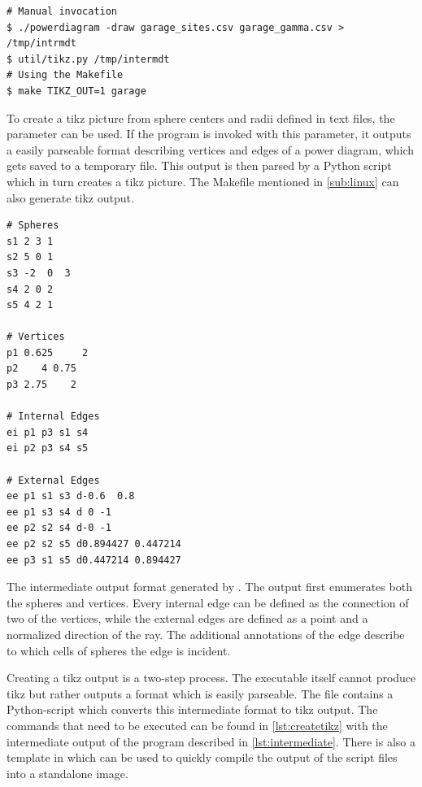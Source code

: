 \begin{listing}[tb]
    \begin{verbatim}
# Manual invocation
$ ./powerdiagram -draw garage_sites.csv garage_gamma.csv > /tmp/intrmdt
$ util/tikz.py /tmp/intermdt
# Using the Makefile
$ make TIKZ_OUT=1 garage
    \end{verbatim}
    \caption{To create a tikz picture from sphere centers and radii defined in text files, the  parameter can be used.
        If the program is invoked with this parameter, it outputs a easily parseable format describing vertices and edges of a power diagram, which gets saved to a temporary file.
        This output is then parsed by a Python script which in turn creates a tikz picture.
        The Makefile mentioned in \cref{sub:linux} can also generate tikz output.}
    \label{lst:createtikz}
\end{listing}
\begin{listing}[tb]
    \begin{verbatim}
# Spheres
s1 2 3 1
s2 5 0 1
s3 -2  0  3
s4 2 0 2
s5 4 2 1

# Vertices
p1 0.625     2
p2    4 0.75
p3 2.75    2

# Internal Edges
ei p1 p3 s1 s4
ei p2 p3 s4 s5

# External Edges
ee p1 s1 s3 d-0.6  0.8
ee p1 s3 s4 d 0 -1
ee p2 s2 s4 d-0 -1
ee p2 s2 s5 d0.894427 0.447214
ee p3 s1 s5 d0.447214 0.894427
    \end{verbatim}
    \caption{The intermediate output format generated by .
    The output first enumerates both the spheres and vertices.
    Every internal edge can be defined as the connection of two of the vertices, while the external edges are defined as a point and a normalized direction of the ray.
    The additional annotations of the edge describe to which cells of spheres the edge is incident.}
    \label{lst:intermediate}
\end{listing}
Creating a tikz output is a two-step process.
The \CC executable itself cannot produce tikz but rather outputs a format which is easily parseable.
The file  contains a Python-script which converts this intermediate format to tikz output.
The commands that need to be executed can be found in \cref{lst:createtikz} with the intermediate output of the \CC program described in \cref{lst:intermediate}.
There is also a template in  which can be used to quickly compile the output of the script files into a standalone image.

\clearpage
\printbibliography

